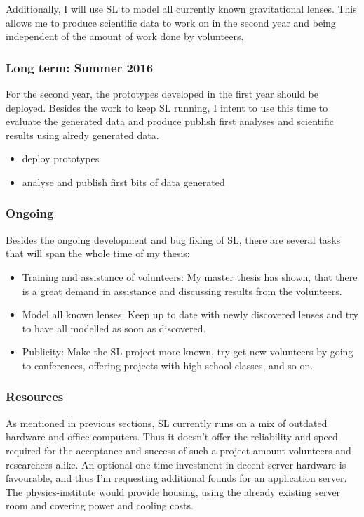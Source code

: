 \documentclass[11pt]{article}
\begin{document}
Additionally, I will use SL to model all currently known gravitational lenses.
This allows me to produce scientific data to work on in the second year and being independent of the amount of work done by volunteers.


\subsubsection{Long term: Summer 2016}

For the second year, the prototypes developed in the first year should be deployed.
Besides the work to keep SL running, I intent to use this time to evaluate the generated data and produce publish first analyses and scientific results using alredy generated data.

\begin{itemize}
  \item deploy prototypes
  \item analyse and publish first bits of data generated
\end{itemize}


\subsubsection{Ongoing}
\label{sec:ongoing}

Besides the ongoing development and bug fixing of SL, there are several tasks that will span the whole time of my thesis:
\begin{itemize}
  \item Training and assistance of volunteers: My master thesis has shown, that there is a great demand in assistance and discussing results from the volunteers.
  \item Model all known lenses: Keep up to date with newly discovered lenses and try to have all modelled as soon as discovered.
  \item Publicity: Make the SL project more known, try get new volunteers by going to conferences, offering projects with high school classes, and so on.
\end{itemize}


\subsubsection{Resources}

As mentioned in previous sections, SL currently runs on a mix of outdated hardware and office computers.
Thus it doesn't offer the reliability and speed required for the acceptance and success of such a project amount volunteers and researchers alike.
An optional one time investment in decent server hardware is favourable, and thus I'm requesting additional founds for an application server.
The physics-institute would provide housing, using the already existing server room and covering power and cooling costs.
\end{document}
